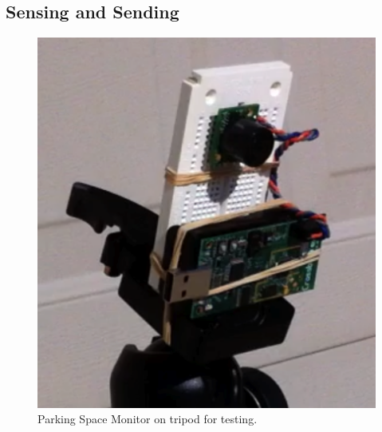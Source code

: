 \documentclass{acm_proc}
\begin{document}
\subsection{Sensing and Sending}

\begin{figure}
    \begin{center}
		\includegraphics[width=\columnwidth]{figures/parking_sensor}
	\end{center}
	\caption{Parking Space Monitor on tripod for testing.}
	\label{fig:parking_sensor}
\end{figure}
\end{document}
